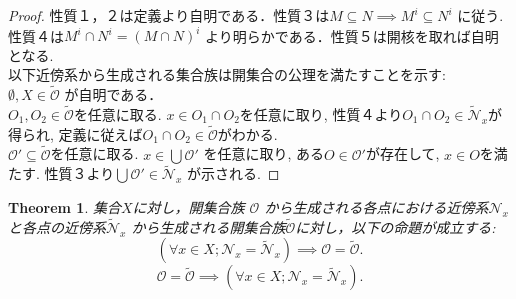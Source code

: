 \documentclass[dvipdfmx]{jbook}
\newtheorem{theorem}{Theorem}[section]
\theoremstyle{remark}
\theoremstyle{plain}
\begin{document}
\begin{proof}
	性質１，２は定義より自明である．性質３は$M\subseteq N \implies M^{i} \subseteq N^{i}$ に従う. 性質４は$M^{i}\cap N^{i} = \left( M \cap N \right) ^{i}$ より明らかである．性質５は開核を取れば自明となる.\\
	以下近傍系から生成される集合族は開集合の公理を満たすことを示す:\\
	$\emptyset ,X \in \tilde{\mathcal{O}}$ が自明である．\\
	$O_1 ,O_2 \in \tilde{\mathcal{O}}$を任意に取る. 
	$x \in O_1 \cap O_2$を任意に取り, 性質４より$O_1 \cap O_2 \in \mathcal{\tilde{N}}_x$が得られ, 定義に従えば$O_1 \cap O_2 \in \tilde{\mathcal{O}}$がわかる.\\
	$\mathcal{O}' \subseteq \tilde{\mathcal{O}}$を任意に取る.
	$x \in \bigcup \mathcal{O}'  $ を任意に取り,
	ある$O \in \mathcal{O}'$が存在して, $x \in O$を満たす. 性質３より$\bigcup \mathcal{O}' \in \mathcal{\tilde{N}}_x$ が示される.
\end{proof}

\begin{theorem}
	集合$X$に対し，開集合族 $\mathcal{O}$ から生成される各点における近傍系$\mathcal{N}_x$ 
	と各点の近傍系$\mathcal{\tilde{N}}_x$ から生成される開集合族$\tilde{\mathcal{O}}$に対し，以下の命題が成立する:
	\[
		\left( \forall x \in X; \mathcal{N}_x = \mathcal{\tilde{N}}_x \right) \implies \mathcal{O} = \tilde{\mathcal{O}}
	.\] 
	\[
	\mathcal{O} = \tilde{\mathcal{O}} \implies \left( \forall x \in X; \mathcal{N}_x = \mathcal{\tilde{N}}_x \right)
	.\] 
\end{theorem}
\end{document}
